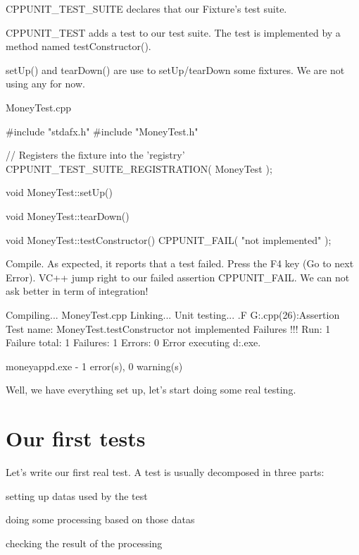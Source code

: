 \begin{DoxyItemize}
\item CPPUNIT\_\-TEST\_\-SUITE declares that our Fixture's test suite.
\item CPPUNIT\_\-TEST adds a test to our test suite. The test is implemented by a method named testConstructor().
\item setUp() and tearDown() are use to setUp/tearDown some fixtures. We are not using any for now.
\end{DoxyItemize}

{\ttfamily MoneyTest.cpp} 
\begin{DoxyCode}
#include "stdafx.h"
#include "MoneyTest.h"

// Registers the fixture into the 'registry'
CPPUNIT_TEST_SUITE_REGISTRATION( MoneyTest );


void 
MoneyTest::setUp()
{
}


void 
MoneyTest::tearDown()
{
}


void 
MoneyTest::testConstructor()
{
  CPPUNIT_FAIL( "not implemented" );
}
\end{DoxyCode}


Compile. As expected, it reports that a test failed. Press the {\ttfamily F4} key (Go to next Error). VC++ jump right to our failed assertion CPPUNIT\_\-FAIL. We can not ask better in term of integration! \begin{DoxyVerb}
Compiling...
MoneyTest.cpp
Linking...
Unit testing...
.F
G:\prg\vc\Lib\cppunit\examples\money\MoneyTest.cpp(26):Assertion
Test name: MoneyTest.testConstructor
not implemented
Failures !!!
Run: 1   Failure total: 1   Failures: 1   Errors: 0
Error executing d:\winnt{}\cmd.exe.

moneyappd.exe - 1 error(s), 0 warning(s)
\end{DoxyVerb}


Well, we have everything set up, let's start doing some real testing.\hypertarget{money_example_sec_first_tests}{}\section{Our first tests}\label{money_example_sec_first_tests}
Let's write our first real test. A test is usually decomposed in three parts:
\begin{DoxyItemize}
\item setting up datas used by the test
\item doing some processing based on those datas
\item checking the result of the processing
\end{DoxyItemize}


